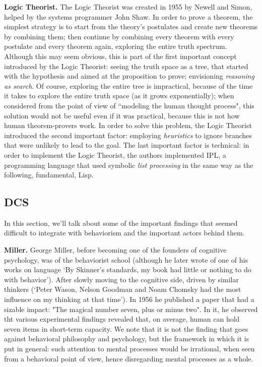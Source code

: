 \documentclass[../main.tex]{subfiles}
\begin{document}
\vspace{4pt}
\textbf{Logic Theorist.}
The Logic Theorist was created in 1955 by Newell and Simon, helped by the systems programmer John Shaw. In order to prove a theorem, the simplest strategy is to start from the theory's postulates and create new theorems by combining them; then continue by combining every theorem with every postulate and every theorem again, exploring the entire truth spectrum. Although this may seem obvious, this is part of the first important concept introduced by the Logic Theorist: seeing the truth space as a tree, that started with the hypothesis and aimed at the proposition to prove; envisioning \textit{reasoning as search}. Of course, exploring the entire tree is impractical, because of the time it takes to explore the entire truth space (as it grows exponentially); when considered from the point of view of ``modeling the human thought process", this solution would not be useful even if it was practical, because this is not how human theorem-provers work. In order to solve this problem, the Logic Theorist introduced the second important factor: employing \textit{heuristics} to ignore branches that were unlikely to lead to the goal. The last important factor is technical: in order to implement the Logic Theorist, the authors implemented IPL, a programming language that used symbolic \textit{list processing} in the same way as the following, fundamental, Lisp.

\subsection{DCS}
In this section, we'll talk about some of the important findings that seemed difficult to integrate with behaviorism and the important actors behind them.

\vspace{4pt}
\textbf{Miller.}
George Miller, before becoming one of the founders of cognitive psychology, was of the behaviorist school (although he later wrote of one of his works on language \enquote*{By Skinner’s standards, my book had little or nothing to do with behavior}\cite{millerCognitiveRevolutionHistorical2003}). After slowly moving to the cognitive side, driven by similar thinkers (\enquote*{Peter Wason, Nelson Goodman and Noam Chomsky had the most influence on my thinking at that time}). In 1956 he published a paper that had a sizable impact: "The magical number seven, plus or minus two". In it, he observed tht various experimental findings revealed that, on average, human can hold seven items in short-term capacity. We note that it is not the finding that goes against behavioral philosophy and psychology, but the framework in which it is put in general: such attention to mental processes would be irrational, when seen from a behavioral point of view, hence disregarding mental processes as a whole. 
\end{document}
